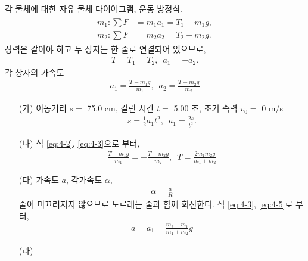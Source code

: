 \documentclass[floatfix,nofootinbib,superscriptaddress,fleqn]{revtex4-2}
\begin{document}


각 물체에 대한 자유 물체 다이어그램, 운동 방정식.
\begin{align}\label{eq:4-1}
    \begin{split}
        m_1:\sum F &= m_1a_1 = T_1 - m_1g,   \\
        m_2:\sum F &= m_2a_2 = T_2 - m_2g.
    \end{split}
\end{align}
장력은 같아야 하고 두 상자는 한 줄로 연결되어 있으므로,
\begin{align}\label{eq:4-2}
    T=T_1=T_2,\,\,\,a_1=-a_2.
\end{align}
각 상자의 가속도
    \begin{align}\label{eq:4-3}
        a_1 = \frac{T-m_1g}{m_1},\,\,\,a_2 = \frac{T-m_2g}{m_2}
    \end{align}
\begin{itemize}
    \item[(가)] 
    이동거리 $s=$ 75.0 cm, 걸린 시간 $t=$ 5.00 초, 
    초기 속력 $v_0=$ 0 m/s
    \begin{align}\label{eq:4-4}
        s = \frac{1}{2}a_1t^2,\,\,\,a_1 = \frac{2s}{t^2}.
    \end{align}
    \item[(나)]
    식 \eqref{eq:4-2}, \eqref{eq:4-3}으로 부터,
    \begin{align}\label{eq:4-5}
        \frac{T-m_1g}{m_1}= -\frac{T-m_2g}{m_2},\,\,\,T = \frac{2m_1m_2g}{m_1+m_2}
    \end{align}
    \item[(다)] 가속도 $a$, 각가속도 $\alpha$,
    \begin{align}\label{eq:4-6}
        \alpha=\frac{a}{R}
    \end{align}
    줄이 미끄러지지 않으므로 도르래는 줄과 함께 회전한다.
    식 \eqref{eq:4-3}, \eqref{eq:4-5}로 부터,
    \begin{align}
        a = a_1 =\frac{m_2-m_1}{m_1+m_2}g
    \end{align}
    \item[(라)]    
\end{itemize}
\end{document}
